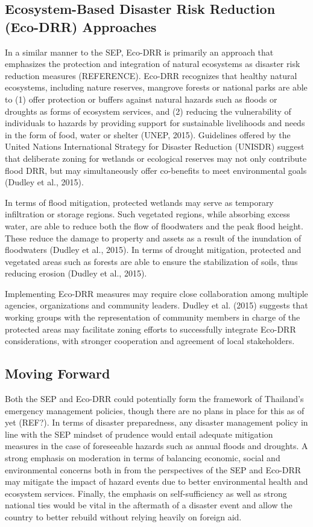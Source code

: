 \subsection{Ecosystem-Based Disaster Risk Reduction (Eco-DRR) Approaches}

In a similar manner to the SEP, Eco-DRR is primarily an approach that emphasizes the protection and integration of natural ecosystems as disaster risk reduction measures (REFERENCE). Eco-DRR recognizes that healthy natural ecosystems, including nature reserves, mangrove forests or national parks are able to (1) offer protection or buffers against natural hazards such as floods or droughts as forms of ecosystem services, and (2) reducing the vulnerability of individuals to hazards by providing support for sustainable livelihoods and needs in the form of food, water or shelter (UNEP, 2015). Guidelines offered by the United Nations International Strategy for Disaster Reduction (UNISDR) suggest that deliberate zoning for wetlands or ecological reserves may not only contribute flood DRR, but may simultaneously offer co-benefits to meet environmental goals (Dudley et al., 2015). 

In terms of flood mitigation, protected wetlands may serve as temporary infiltration or storage regions. Such vegetated regions, while absorbing excess water, are able to reduce both the flow of floodwaters and the peak flood height. These reduce the damage to property and assets as a result of the inundation of floodwaters (Dudley et al., 2015). In terms of drought mitigation, protected and vegetated areas such as forests are able to ensure the stabilization of soils, thus reducing erosion (Dudley et al., 2015).

Implementing Eco-DRR measures may require close collaboration among multiple agencies, organizations and community leaders. Dudley et al. (2015) suggests that working groups with the representation of community members in charge of the protected areas may facilitate zoning efforts to successfully integrate Eco-DRR considerations, with stronger cooperation and agreement of local stakeholders.  

\subsection{Moving Forward}

Both the SEP and Eco-DRR could potentially form the framework of Thailand’s emergency management policies, though there are no plans in place for this as of yet (REF?). In terms of disaster preparedness, any disaster management policy in line with the SEP mindset of prudence would entail adequate mitigation measures in the case of foreseeable hazards such as annual floods and droughts. A strong emphasis on moderation in terms of balancing economic, social and environmental concerns both in from the perspectives of the SEP and Eco-DRR may mitigate the impact of hazard events due to better environmental health and ecosystem services. Finally, the emphasis on self-sufficiency as well as strong national ties would be vital in the aftermath of a disaster event and allow the country to better rebuild without relying heavily on foreign aid.

